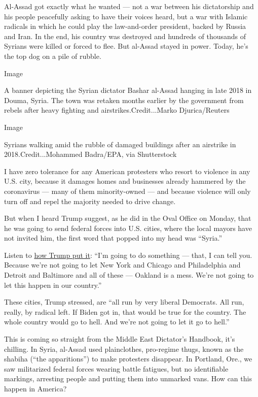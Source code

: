 Al-Assad got exactly what he wanted --- not a war between his
dictatorship and his people peacefully asking to have their voices
heard, but a war with Islamic radicals in which he could play the
law-and-order president, backed by Russia and Iran. In the end, his
country was destroyed and hundreds of thousands of Syrians were killed
or forced to flee. But al-Assad stayed in power. Today, he's the top dog
on a pile of rubble.

Image

A banner depicting the Syrian dictator Bashar al-Assad hanging in late
2018 in Douma, Syria. The town was retaken months earlier by the
government from rebels after heavy fighting and
airstrikes.Credit...Marko Djurica/Reuters

Image

Syrians walking amid the rubble of damaged buildings after an airstrike
in 2018.Credit...Mohammed Badra/EPA, via Shutterstock

I have zero tolerance for any American protesters who resort to violence
in any U.S. city, because it damages homes and businesses already
hammered by the coronavirus --- many of them minority-owned --- and
because violence will only turn off and repel the majority needed to
drive change.

But when I heard Trump suggest, as he did in the Oval Office on Monday,
that he was going to send federal forces into U.S. cities, where the
local mayors have not invited him, the first word that popped into my
head was ``Syria.''

Listen to
\href{https://www.whitehouse.gov/briefings-statements/remarks-president-trump-phase-four-negotiations/}{how
Trump put it}: ``I'm going to do something --- that, I can tell you.
Because we're not going to let New York and Chicago and Philadelphia and
Detroit and Baltimore and all of these --- Oakland is a mess. We're not
going to let this happen in our country.''

These cities, Trump stressed, are ``all run by very liberal Democrats.
All run, really, by radical left. If Biden got in, that would be true
for the country. The whole country would go to hell. And we're not going
to let it go to hell.''

This is coming so straight from the Middle East Dictator's Handbook,
it's chilling. In Syria, al-Assad used plainclothes, pro-regime thugs,
known as the shabiha (``the apparitions'') to make protesters disappear.
In Portland, Ore., we saw militarized federal forces wearing battle
fatigues, but no identifiable markings, arresting people and putting
them into unmarked vans. How can this happen in America?

